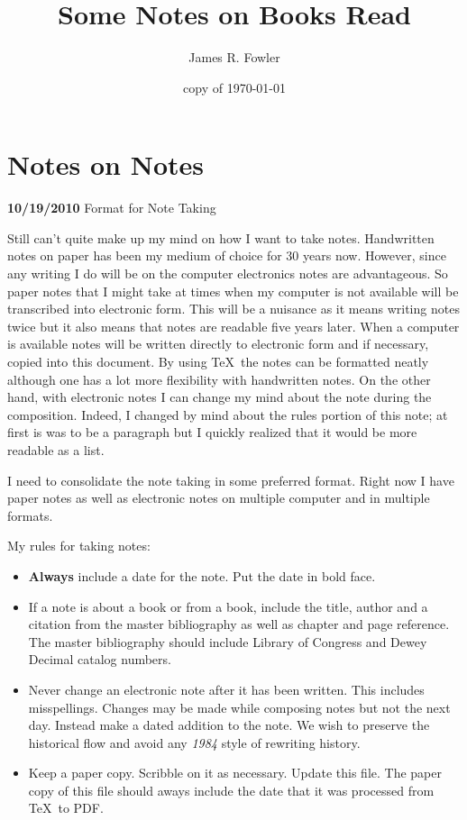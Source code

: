 \documentclass{article}
\begin{document}
\title{Some Notes on Books Read}
\author{James R. Fowler}
\date{copy of \today}
\maketitle

\section{Notes on Notes}

{\bf 10/19/2010} Format for Note Taking

Still can't quite make up my mind on how I want to take
notes. Handwritten notes on paper has been my medium of choice for 30
years now. However, since any writing I do will be on the computer
electronics notes are advantageous.  So paper notes that I might take
at times when my computer is not available will be transcribed into
electronic form. This will be a nuisance as it means writing notes
twice but it also means that notes are readable five years later.
When a computer is available notes will be written directly to
electronic form and if necessary, copied into this document.  By using
\TeX\ the notes can be formatted neatly although one has a lot more
flexibility with handwritten notes. On the other hand, with electronic
notes I can change my mind about the note during the composition.
Indeed, I changed by mind about the rules portion of this note; at
first is was to be a paragraph but I quickly realized that it would be
more readable as a list.

I need to consolidate the note taking in some preferred format.  Right now
I have paper notes as well as electronic notes on multiple computer
and in multiple formats.

My rules for taking notes:
\begin{itemize}
\item {\bf Always} include a date for the note. Put the date in bold face.
\item If a note is about a book or from a book, include the title,
  author and a citation from the master bibliography as well as
  chapter and page reference. The master bibliography should include
  Library of Congress and Dewey Decimal catalog numbers.
\item Never change an electronic note after it has been written. This
  includes misspellings. Changes may be made while composing notes but
  not the next day. Instead make a dated addition to the note. We wish
  to preserve the historical flow and avoid any {\it 1984} style of
  rewriting history.
\item Keep a paper copy. Scribble on it as necessary. Update this file.
The paper copy of this file should aways include the date that it was
processed from \TeX\ to PDF.
\end{itemize}
\end{document}
